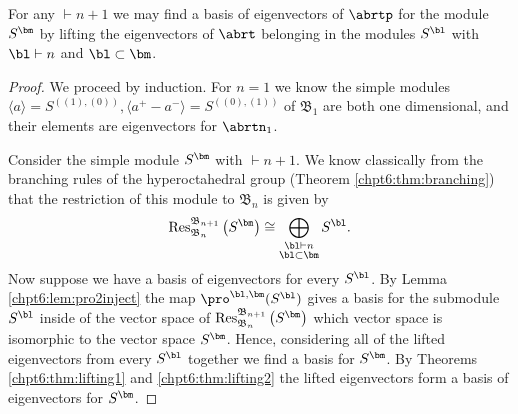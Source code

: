 \documentclass[11pt]{report}
\begin{document}
\begin{lemma}
	\label{chpt6:lem:liftingunique}
	For any $\bm \vdash n+1$ we may find a basis of eigenvectors of $\abrtp$ 
	for the module $S^{\bm}$ by lifting the eigenvectors of $\abrt$ 
	belonging in the modules $S^{\bl}$ with $\bl \vdash n$ and $\bl \subset \bm$.
\end{lemma}
\begin{proof}
	We proceed by induction. For $n=1$ we know the simple modules $\langle a \rangle = S^{((1),(0))}, 
	\langle a^{+} - a^{-} \rangle = S^{((0),(1))}$ of $\mathfrak{B}_{1}$ are both one dimensional, and their elements are eigenvectors for $\abrtn_{1}$. 	
	
	
	
	
	
	
	Consider the simple module $S^{\bm}$ with $\bm\vdash 
	n+1$. We know classically 
	from the branching rules of the hyperoctahedral group (Theorem \ref{chpt6:thm:branching}) that the restriction of this module to 
	$\mathfrak{B}_{n}$ is given by
	\[\textnormal{Res}_{\mathfrak{B}_{n}}^{\mathfrak{B}_{n+1}} \left( 
	S^{\bm}\right) \cong \bigoplus_{\substack{\bl 
			\vdash n \\ \bl \subset \bm}} 
	S^{\bl} .\]
	Now suppose we have a basis of eigenvectors for every 
	$S^{\bl}$. By Lemma \ref{chpt6:lem:pro2inject} the map 
	$\pro^{\bl,\bm}(S^{\bl})$ gives a 
	basis for the submodule $S^{\bl}$ inside of the vector space of 
	$\textnormal{Res}_{\mathfrak{B}_{n}}^{\mathfrak{B}_{n+1}} \left( 
	S^{\bm}\right)$ which vector space is isomorphic to the vector space 	$S^{\bm}$. Hence, considering all of the lifted eigenvectors 
	from every $S^{\bl}$ together we find a basis for 
	$S^{\bm}$. By Theorems \ref{chpt6:thm:lifting1} and \ref{chpt6:thm:lifting2} 
	the lifted eigenvectors form a basis of eigenvectors for 
	$S^{\bm}$.
\end{proof}
\end{document}
